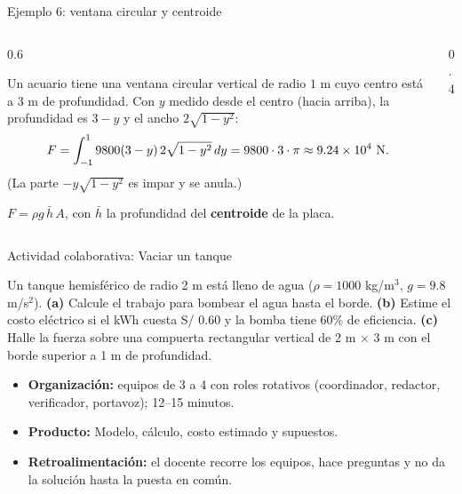 \documentclass[10pt,aspectratio=169]{beamer}
\begin{document}
\begin{frame}{Ejemplo 6: ventana circular y centroide}
  \begin{columns}
    \begin{column}{0.6\textwidth}
      \begin{ejemplo}
        Un acuario tiene una ventana circular vertical de radio $1$ m cuyo centro está a $3$ m de profundidad.
        Con $y$ medido desde el centro (hacia arriba), la profundidad es $3-y$ y el ancho $2\sqrt{1-y^2}$:
        \[ F=\int_{-1}^19800(3-y)\,2\sqrt{1-y^2}\dy=9800\cdot3\cdot\pi\approx9.24\times10^4\ \text{N}. \]
        (La parte $-y\sqrt{1-y^2}$ es impar y se anula.)
      \end{ejemplo}
      \begin{idea}
        $F=\rho g\,\bar h\,A$, con $\bar h$ la profundidad del \textbf{centroide} de la placa.
      \end{idea}
    \end{column}
    \begin{column}{0.4\textwidth}
      \centering
    \end{column}
  \end{columns}
\end{frame}

\begin{frame}{Actividad colaborativa: Vaciar un tanque}
  \small
  \begin{activa}
    Un tanque hemisférico de radio 2 m está lleno de agua ($\rho=1000$ kg/m$^3$, $g=9.8$ m/s$^2$). \textbf{(a)} Calcule el trabajo para bombear el agua hasta el borde. \textbf{(b)} Estime el costo eléctrico si el kWh cuesta S/ 0.60 y la bomba tiene 60\% de eficiencia. \textbf{(c)} Halle la fuerza sobre una compuerta rectangular vertical de 2 m $\times$ 3 m con el borde superior a 1 m de profundidad.
  \end{activa}
  \begin{itemize}
    \item \textbf{Organización:} equipos de 3 a 4 con roles rotativos (coordinador, redactor, verificador, portavoz); 12--15 minutos.
    \item \textbf{Producto:} Modelo, cálculo, costo estimado y supuestos.
    \item \textbf{Retroalimentación:} el docente recorre los equipos, hace preguntas y no da la solución hasta la puesta en común.
  \end{itemize}
\end{frame}
\end{document}

